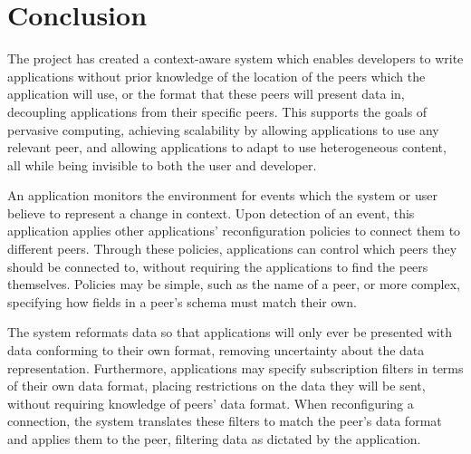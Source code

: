 \documentclass[12pt,twoside,notitlepage]{report}
\begin{document}




\cleardoublepage

\chapter{Conclusion}

The project has created a context-aware system which enables developers to write applications without prior knowledge of the location of the peers which the application will use, or the format that these peers will present data in, decoupling applications from their specific peers. 
This supports the goals of pervasive computing, achieving scalability by allowing applications to use any relevant peer, and allowing applications to adapt to use heterogeneous content, all while being invisible to both the user and developer.

An application monitors the environment for events which the system or user believe to represent a change in context.
Upon detection of an event, this application applies other applications' reconfiguration policies to connect them to different peers. 
Through these policies, applications can control which peers they should be connected to, without requiring the applications to find the peers themselves.
Policies may be simple, such as the name of a peer, or more complex, specifying how fields in a peer's schema must match their own. 

The system reformats data so that applications will only ever be presented with data conforming to their own format, removing uncertainty about the data representation. 
Furthermore, applications may specify subscription filters in terms of their own data format, placing restrictions on the data they will be sent, without requiring knowledge of peers' data format.
When reconfiguring a connection, the system translates these filters to match the peer's data format and applies them to the peer, filtering data as dictated by the application.

\end{document}
